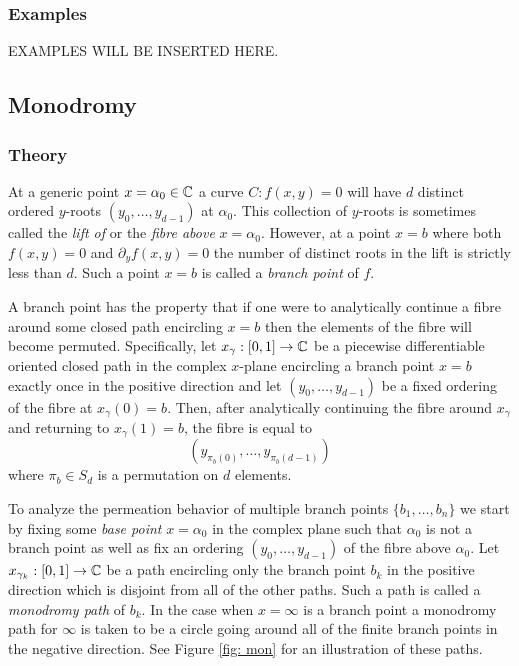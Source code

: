 %
\subsubsection*{Examples}
%

\vspace{24pt}

EXAMPLES WILL BE INSERTED HERE.

\vspace{24pt}


\subsection{Monodromy} \label{sec: monodromy}

%
\subsubsection*{Theory}
%

At a generic point $x = \alpha_0 \in \operatorname{\mathbb{C}}$ a curve $C : f(x,y) = 0$ will
have $d$ distinct ordered $y$-roots $(y_0,\ldots,y_{d-1})$ at
$\alpha_0$. This collection of $y$-roots is sometimes called the {\it
  lift of} or the {\it fibre above} $x=\alpha_0$. However, at a point
$x=b$ where both $f(x,y) = 0$ and $\partial_y f(x,y) = 0$ the number of
distinct roots in the lift is strictly less than $d$. Such a point $x =
b$ is called a {\it branch point} of $f$.

A branch point has the property that if one were to analytically
continue a fibre around some closed path encircling $x=b$ then the
elements of the fibre will become permuted. Specifically, let
$x_{\gamma} : [0,1] \to \operatorname{\mathbb{C}}$ be a piecewise differentiable oriented
closed path in the complex $x$-plane encircling a branch point $x=b$
exactly once in the positive direction and let $(y_0,\ldots,y_{d-1})$ be
a fixed ordering of the fibre at $x_\gamma(0) = b$. Then, after
analytically continuing the fibre around $x_\gamma$ and returning to
$x_\gamma(1) = b$, the fibre is equal to
\[
    (y_{\pi_b(0)}, \ldots, y_{\pi_b(d-1)})
\]
where $\pi_b \in S_d$ is a permutation on $d$ elements.

To analyze the permeation behavior of multiple branch points
$\{b_1,\ldots,b_n\}$ we start by fixing some {\it base point}
$x=\alpha_0$ in the complex plane such that $\alpha_0$ is not a branch
point as well as fix an ordering $(y_0,\ldots,y_{d-1})$ of the fibre
above $\alpha_0$. Let $x_{\gamma_k} : [0,1] \to \operatorname{\mathbb{C}}$ be a path
encircling only the branch point $b_k$ in the positive direction which
is disjoint from all of the other paths. Such a path is called a {\it
  monodromy path} of $b_k$. In the case when $x = \infty$ is a branch
point a monodromy path for $\infty$ is taken to be a circle going around
all of the finite branch points in the negative direction. See Figure
\ref{fig: mon} for an illustration of these paths.

